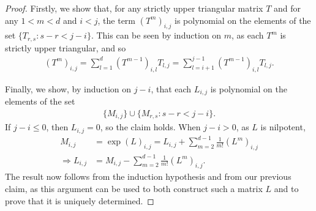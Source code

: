 \begin{proof}
Firstly, we show that, for any strictly upper triangular matrix $T$ and for any $1<m<d$ and $i<j$, the term $(T^{m})_{i,j}$ is polynomial on the elements of the set $\lbrace T_{r,s} : s-r<j-i \rbrace$. This can be seen by induction on $m$, as each $T^{m}$ is strictly upper triangular, and so
\begin{align*}
(T^{m})_{i,j} = \sum\limits_{l=1}^{d} (T^{m-1})_{i,l} T_{l,j} = \sum\limits_{l=i+1}^{j-1} (T^{m-1})_{i,l} T_{l,j} .
\end{align*}

Finally, we show, by induction on $j-i$, that each $L_{i,j}$ is polynomial on the elements of the set
\begin{align*}
\lbrace M_{i,j} \rbrace \cup \lbrace M_{r,s} : s-r < j-i \rbrace .
\end{align*}
If $j-i \leq 0$, then $L_{i,j}=0$, so the claim holds. When $j-i>0$, as $L$ is nilpotent,
\begin{align*}
M_{i,j} &= \exp(L)_{i,j} = L_{i,j} + \sum\limits_{m=2}^{d-1} \frac{1}{m!} (L^{m})_{i,j} \\ \Rightarrow L_{i,j} &= M_{i,j} - \sum\limits_{m=2}^{d-1} \frac{1}{m!} (L^{m})_{i,j} .
\end{align*}
The result now follows from the induction hypothesis and from our previous claim, as this argument can be used to both construct such a matrix $L$ and to prove that it is uniquely determined.
\end{proof}
